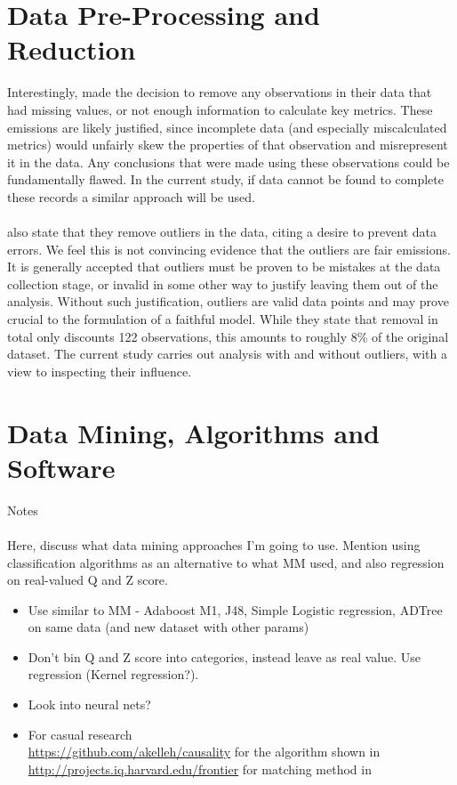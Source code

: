 \section{Data Pre-Processing and Reduction}
{Interestingly, \cite{moldovan2015learning} made the decision to remove any observations in their data that had missing values, or not enough information to calculate key metrics. These emissions are likely justified, since incomplete data (and especially miscalculated metrics) would unfairly skew the properties of that observation and misrepresent it in the data. Any conclusions that were made using these observations could be fundamentally flawed. In the current study, if data cannot be found to complete these records a similar approach will be used. \\\\
\cite{moldovan2015learning} also state that they remove outliers in the data, citing a desire to prevent data errors. We feel this is not convincing evidence that the outliers are fair emissions. It is generally accepted that outliers must be proven to be mistakes at the data collection stage, or invalid in some other way to justify leaving them out of the analysis. Without such justification, outliers are valid data points and may prove crucial to the formulation of a faithful model. While they state that removal in total only discounts 122 observations, this amounts to roughly 8\% of the original dataset. The current study carries out analysis with and without outliers, with a view to inspecting their influence. 
\section{Data Mining, Algorithms and Software}
Notes \\\\
Here, discuss what data mining approaches I'm going to use. Mention using classification algorithms as an alternative to what MM used, and also regression on real-valued Q and Z score.
\begin{itemize}
\item{Use similar to MM - Adaboost M1, J48, Simple Logistic regression, ADTree on same data (and new dataset with other params)}
\item{Don't bin Q and Z score into categories, instead leave as real value. Use regression (Kernel regression?).}
\item{Look into neural nets?  }
\item{For casual research}\\
{\url {https://github.com/akelleh/causality} for the algorithm shown in \cite{pearl1995theory}}
{\url{http://projects.iq.harvard.edu/frontier} for matching method in \cite{king2014balance}}


\end{itemize}}
